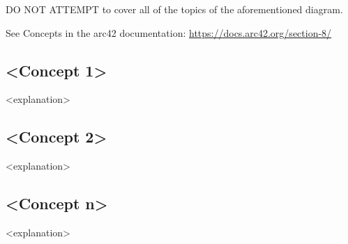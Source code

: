 DO NOT ATTEMPT to cover all of the topics of the aforementioned diagram.

See Concepts in the arc42 documentation:
\href{https://docs.arc42.org/section-8/}{https://docs.arc42.org/section-8/}

\subsection{\textless Concept 1\textgreater}
\textless explanation\textgreater

\subsection{\textless Concept 2\textgreater}
\textless explanation\textgreater

\subsection{\textless Concept n\textgreater}
\textless explanation\textgreater

